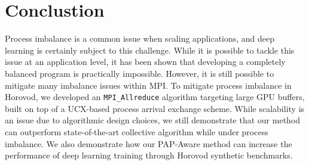 \section{Conclustion}
Process imbalance is a common issue when scaling applications, and deep learning is certainly subject to this challenge.
While it is possible to tackle this issue at an application level, it has been shown that developing a completely balanced program is practically impossible.
However, it is still possible to mitigate many imbalance issues within MPI.
To mitigate process imbalance in Horovod, we developed an \texttt{MPI\_Allreduce} algorithm targeting large GPU buffers, built on top of a UCX-based process arrival exchange scheme.  
While scalability is an issue due to algorithmic design choices, we still demonstrate that our method can outperform state-of-the-art collective algorithm while under process imbalance.
We also demonstrate how our PAP-Aware method can increase the performance of deep learning training through Horovod synthetic benchmarks.

